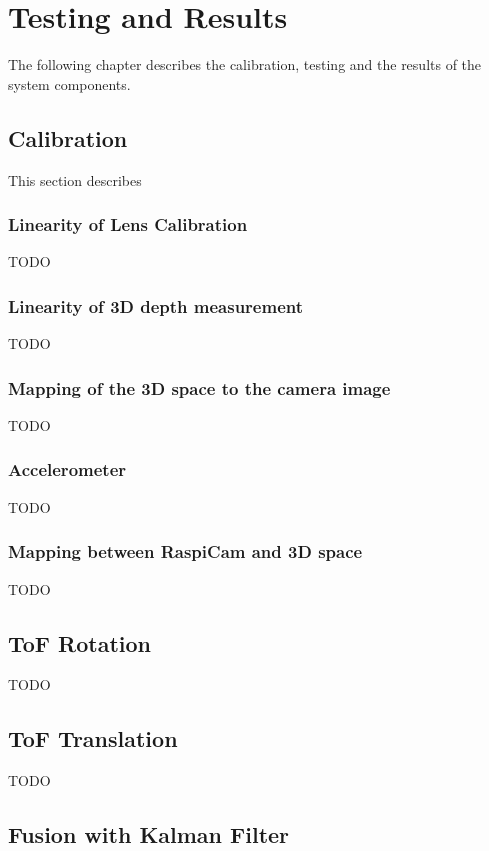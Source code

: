 \chapter{Testing and Results}
\label{sec:Results}
The following chapter describes the calibration, testing and the results of the system components. 
\section{Calibration}
This section describes 
\subsection{Linearity of Lens Calibration}
TODO
\subsection{Linearity of 3D depth measurement}
TODO
\subsection{Mapping of the 3D space to the camera image}
TODO
\subsection{Accelerometer}
TODO
\subsection{Mapping between RaspiCam and 3D space}
TODO
\section{ToF Rotation}
TODO
\section{ToF Translation}
TODO
\section{Fusion with Kalman Filter}
